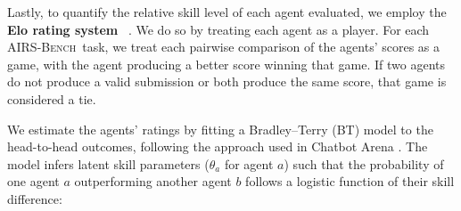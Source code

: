 \documentclass{fairmeta}
\newcommand{\airsbench}{\textsc{AIRS-Bench}}
\begin{document}

Lastly, to quantify the relative skill level of each agent evaluated, we employ the \textbf{Elo rating system} ~\citep{elo1967proposed}. We do so by treating each agent as a player. For each \airsbench~task, we treat each pairwise comparison of the agents' scores as a game, with the agent producing a better score winning that game. If two agents do not produce a valid submission or both produce the same score, that game is considered a tie.

We estimate the agents’ ratings by fitting a Bradley–Terry (BT) model to the head-to-head outcomes, following the approach used in Chatbot Arena \citep{chiang2024chatbotarena}. The model infers latent skill parameters ($\theta_a$ for agent $a$) such that the probability of one agent $a$ outperforming another agent $b$ follows a logistic function of their skill difference:
\end{document}
